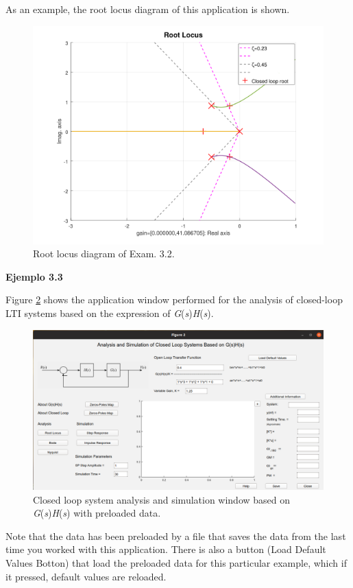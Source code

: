 As an example, the root locus diagram of this application is shown.
\begin{figure}[H]
	\centering
	\includegraphics[scale=0.75]{./figuras/chapter_glc/fig_ejem32_GH_ltitool.png}
	\caption{Root locus diagram of Exam. 3.2.}
	\label{chp_lc_fig_LR_ejemGH}
\end{figure}



\vspace{0.4cm}
\textbf{Ejemplo 3.3}

Figure \ref{chp_lc_fig01_ejemGH} shows the application window performed for the analysis of closed-loop LTI systems based on the expression of \textit{G}(\textit{s})\textit{H}(\textit{s}).
\begin{figure}[H]
	\centering
	\includegraphics[scale=0.5]{./figuras/chapter_glc/fig01_ejemGH.png}
	\caption{Closed loop system analysis and simulation window based on \textit{G}(\textit{s})\textit{H}(\textit{s}) with preloaded data.}
	\label{chp_lc_fig01_ejemGH}
\end{figure}
Note that the data has been preloaded by a file that saves the data from the last time you worked with this application. There is also a button (Load Default Values Botton) that load the preloaded data for this particular example, which if it pressed, default values are reloaded.

